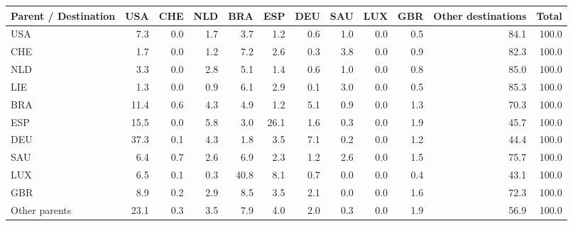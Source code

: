 \begin{tabular}{lrrrrrrrrrrr}
\toprule
Parent / Destination & USA & CHE & NLD & BRA & ESP & DEU & SAU & LUX & GBR & Other destinations & Total \\
\midrule
USA & 7.3 & 0.0 & 1.7 & 3.7 & 1.2 & 0.6 & 1.0 & 0.0 & 0.5 & 84.1 & 100.0 \\
CHE & 1.7 & 0.0 & 1.2 & 7.2 & 2.6 & 0.3 & 3.8 & 0.0 & 0.9 & 82.3 & 100.0 \\
NLD & 3.3 & 0.0 & 2.8 & 5.1 & 1.4 & 0.6 & 1.0 & 0.0 & 0.8 & 85.0 & 100.0 \\
LIE & 1.3 & 0.0 & 0.9 & 6.1 & 2.9 & 0.1 & 3.0 & 0.0 & 0.5 & 85.3 & 100.0 \\
BRA & 11.4 & 0.6 & 4.3 & 4.9 & 1.2 & 5.1 & 0.9 & 0.0 & 1.3 & 70.3 & 100.0 \\
ESP & 15.5 & 0.0 & 5.8 & 3.0 & 26.1 & 1.6 & 0.3 & 0.0 & 1.9 & 45.7 & 100.0 \\
DEU & 37.3 & 0.1 & 4.3 & 1.8 & 3.5 & 7.1 & 0.2 & 0.0 & 1.2 & 44.4 & 100.0 \\
SAU & 6.4 & 0.7 & 2.6 & 6.9 & 2.3 & 1.2 & 2.6 & 0.0 & 1.5 & 75.7 & 100.0 \\
LUX & 6.5 & 0.1 & 0.3 & 40.8 & 8.1 & 0.7 & 0.0 & 0.0 & 0.4 & 43.1 & 100.0 \\
GBR & 8.9 & 0.2 & 2.9 & 8.5 & 3.5 & 2.1 & 0.0 & 0.0 & 1.6 & 72.3 & 100.0 \\
Other parents & 23.1 & 0.3 & 3.5 & 7.9 & 4.0 & 2.0 & 0.3 & 0.0 & 1.9 & 56.9 & 100.0 \\
\bottomrule
\end{tabular}
